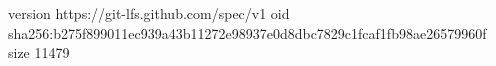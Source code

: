 version https://git-lfs.github.com/spec/v1
oid sha256:b275f899011ec939a43b11272e98937e0d8dbc7829c1fcaf1fb98ae26579960f
size 11479
